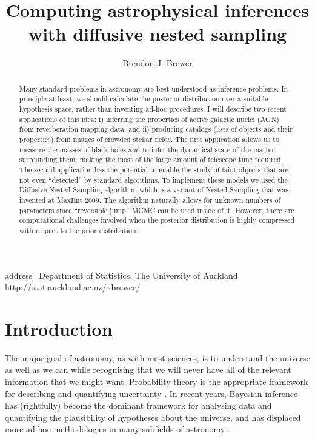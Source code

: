 \documentclass[
  ,final            %
  ]
  {aipproc}
\begin{document}
\title{Computing astrophysical inferences with diffusive nested sampling}


\author{Brendon J. Brewer}{
  address={Department of Statistics, The University of Auckland\\
http://stat.auckland.ac.nz/\~{ }brewer/}
}


\begin{abstract}
Many standard problems in astronomy are best understood as inference problems.
In principle at least,
we should calculate the posterior distribution over a suitable hypothesis space,
rather than inventing ad-hoc procedures. I will describe two recent applications
of this idea: i) inferring the properties of active galactic nuclei (AGN)
from reverberation mapping data, and ii) producing catalogs (lists of objects
and their properties) from images of
crowded stellar fields. The first application allows us to measure the masses
of black holes and to infer the dynamical state of the matter surrounding them,
making the most of the large amount of telescope time required. The second
application has the potential to enable the study of faint objects that are not
even ``detected'' by standard algorithms.
To implement these models we used the Diffusive Nested Sampling algorithm,
which is a variant of Nested Sampling that was invented at MaxEnt 2009. The
algorithm naturally allows for unknown numbers of parameters since
``reversible jump'' MCMC can be used inside of it. However, there are
computational challenges involved when the posterior distribution is highly
compressed with respect to the prior distribution.
\end{abstract}

\maketitle


\section{Introduction}
The major goal of astronomy, as with most sciences, is to understand the
universe as well as we can while recognising that we will never have all of
the relevant information that we might want. Probability theory is the
appropriate framework for describing and quantifying uncertainty
\citep{cox, jaynes}. In recent years, Bayesian inference has (rightfully)
become the dominant framework for analysing data and quantifying the
plausibility of hypotheses about the universe, and has displaced
more ad-hoc methodologies in many subfields of
astronomy \citep[e.g.][]{examples}.
\end{document}
